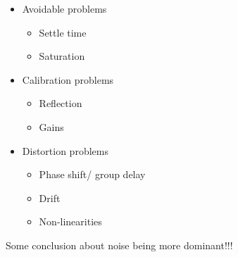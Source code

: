 %
\begin{itemize}
\item Avoidable problems
	\begin{itemize}
	\item Settle time
	\item Saturation
	\end{itemize}
\item Calibration problems
	\begin{itemize}
	\item Reflection
	\item Gains
	\end{itemize}
\item Distortion problems
	\begin{itemize}	
	\item Phase shift/ group delay
	\item Drift
	\item Non-linearities
	\end{itemize}
\end{itemize}
%

Some conclusion about noise being more dominant!!!

